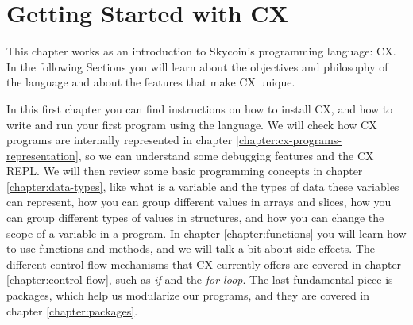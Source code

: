 \documentclass[11pt,fleqn,openany]{book} %
\begin{document}



\chapter{Getting Started with CX}
\label{chapter:getting-started-with-cx}

%

This chapter works as an introduction to Skycoin's programming language: CX. In the following Sections you will learn about the objectives and philosophy of the language and about the features that make CX unique.

In this first chapter you can find instructions on how to install CX, and how to write and run your first program using the language. We will check how CX programs are internally represented in chapter \ref{chapter:cx-programs-representation}, so we can understand some debugging features and the CX REPL. We will then review some basic programming concepts in chapter \ref{chapter:data-types}, like what is a variable and the types of data these variables can represent, how you can group different values in arrays and slices, how you can group different types of values in structures, and how you can change the scope of a variable in a program. In chapter \ref{chapter:functions} you will learn how to use functions and methods, and we will talk a bit about side effects. The different control flow mechanisms that CX currently offers are covered in chapter \ref{chapter:control-flow}, such as \textit{if} and the \textit{for loop}. The last fundamental piece is packages, which help us modularize our programs, and they are covered in chapter \ref{chapter:packages}.
\end{document}

